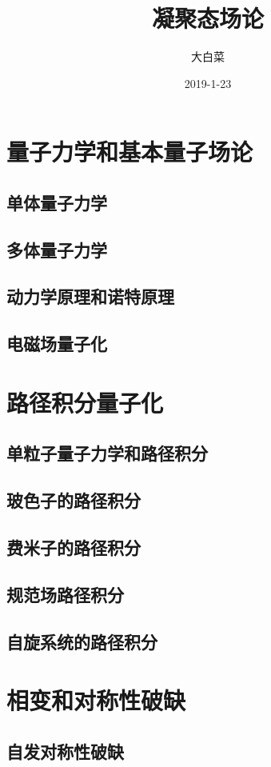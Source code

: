 \documentclass{book}
\begin{document}
\title{凝聚态场论}
\author{大白菜}
\date{2019-1-23}
\maketitle
\tableofcontents
\chapter{量子力学和基本量子场论}
\section{单体量子力学}
\section{多体量子力学}
\section{动力学原理和诺特原理}
\section{电磁场量子化}
\chapter{路径积分量子化}
\section{单粒子量子力学和路径积分}
\section{玻色子的路径积分}
\section{费米子的路径积分}
\section{规范场路径积分}
\section{自旋系统的路径积分}
\chapter{相变和对称性破缺}
\section{自发对称性破缺}
\end{document}
